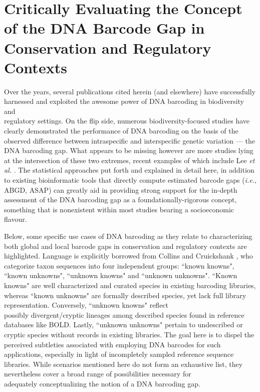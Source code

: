 \section{Critically Evaluating the Concept of the DNA Barcode Gap in Conservation and Regulatory Contexts}

Over the years, several publications cited herein (and elsewhere) have successfully \\ harnessed and exploited the awesome power of DNA barcoding in biodiversity and \\ regulatory settings. On the flip side, numerous biodiversity-focused studies have clearly demonstrated the performance of DNA barcoding on the basis of the observed difference between intraspecific and interspecific genetic variation --- the DNA barcoding gap. What appears to be missing however are more studies lying at the intersection of these two extremes, recent examples of which include Lee \textit{et al.} \cite{lee2019towards}. The statistical approaches put forth and explained in detail here, in addition to existing bioinformatic tools that directly compute estimated barcode gaps (\textit{i.e.}, ABGD, ASAP) can greatly aid in providing strong support for the in-depth assessment of the DNA barcoding gap as a foundationally-rigorous concept, something that is nonexistent within most studies bearing a socioeconomic flavour.



Below, some specific use cases of DNA barcoding as they relate to characterizing both global and local barcode gaps in conservation and regulatory contexts are highlighted. Language is explicitly borrowed from Collins and Cruickshank \cite{collins2014known}, who categorize taxon sequences into four independent groups: ``known knowns", ``known unknowns", ``unknown knowns" and ``unknown unknowns". ``Known knowns" are well characterized and curated species in existing barcoding libraries, whereas ``known unknowns" are formally described species, yet lack full library representation. Conversely, ``unknown knowns" reflect \\ possibly divergent/cryptic lineages among described species found in reference databases like BOLD. Lastly, ``unknown unknowns" pertain to undescribed or cryptic species without records in existing libraries. The goal here is to dispel the perceived subtleties associated with employing DNA barcodes for such applications, especially in light of incompletely sampled reference sequence libraries. While scenarios mentioned here do not form an exhaustive list, they nevertheless cover a broad range of possibilities necessary for \\ adequately conceptualizing the notion of a DNA barcoding gap.



